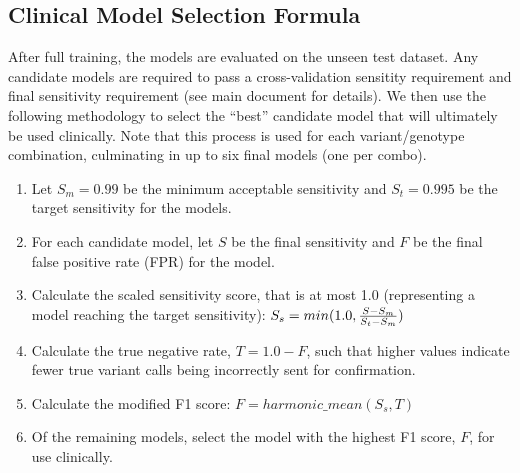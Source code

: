 \subsection{Clinical Model Selection Formula}
After full training, the models are evaluated on the unseen test dataset. Any candidate models are required to pass a cross-validation sensitity requirement and final sensitivity requirement (see main document for details). We then use the following methodology to select the ``best'' candidate model that will ultimately be used clinically.  Note that this process is used for each variant/genotype combination, culminating in up to six final models (one per combo).

\begin{enumerate}
    \item Let $S_m=0.99$ be the minimum acceptable sensitivity and $S_t=0.995$ be the target sensitivity for the models.
    \item For each candidate model, let $S$ be the final sensitivity and $F$ be the final false positive rate (FPR) for the model.
    \item Calculate the scaled sensitivity score, that is at most 1.0 (representing a model reaching the target sensitivity): $S_s = min(1.0, {S - S_m \over S_t - S_m})$
    \item Calculate the true negative rate, $T = 1.0-F$, such that higher values indicate fewer true variant calls being incorrectly sent for confirmation.
    \item Calculate the modified F1 score: $F = harmonic\_mean(S_s, T)$
    \item Of the remaining models, select the model with the highest F1 score, $F$, for use clinically.
\end{enumerate}
